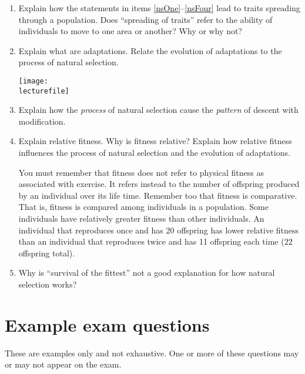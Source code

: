 \documentclass[letterpaper]{tufte-handout}
\newcommand\lecturefile{163_lecture02_fullsize}
\begin{document}
\begin{enumerate}
	\item Explain how the statements in items \ref{nsOne}--\ref{nsFour} lead to traits spreading through a population. Does “spreading of traits” refer to the ability of individuals to move to one area or another? Why or why not?

	\item Explain what are adaptations. Relate the evolution of adaptations to the process of natural selection.
	\begin{marginfigure}
		\texttt{[image: \\lecturefile]}
	\end{marginfigure}
	
	\item Explain how the \emph{process} of natural selection cause the \emph{pattern} of descent with modification.

	\item Explain relative fitness. Why is fitness relative? Explain how relative fitness influences the process of natural selection and the evolution of adaptations.  
	
	You must remember that fitness does not refer to physical fitness as associated with exercise. It refers instead to the number of offspring produced by an individual over its life time. Remember too that fitness is comparative. That is, fitness is compared among individuals in a population. Some individuals have relatively greater fitness than other individuals. An individual that reproduces once and has 20 offspring has lower relative fitness than an individual that reproduces twice and has 11 offspring each time (22 offspring total).

	\item Why is ``survival of the fittest'' not a good explanation for how natural selection works?


\end{enumerate}

\section*{Example exam questions}

These are examples only and not exhaustive. One or more of these questions may or may not appear on the exam.

\bigskip
\end{document}
